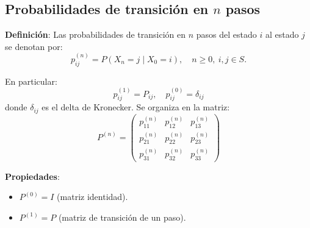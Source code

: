 \documentclass[12pt,a4paper]{article}
\begin{document}
\begin{center}
\end{center}

\subsection*{Probabilidades de transición en $n$ pasos}

\textbf{Definición}: Las probabilidades de transición en $n$ pasos del estado $i$ al estado $j$ se denotan por:
\begin{equation*}
p_{ij}^{(n)} = P(X_n = j \mid X_0 = i), \quad n \geq 0, \ i, j \in S.
\end{equation*}

En particular:
\begin{equation*}
p_{ij}^{(1)} = P_{ij}, \quad p_{ij}^{(0)} = \delta_{ij}
\end{equation*}
donde $\delta_{ij}$ es el delta de Kronecker. Se organiza en la matriz:
\begin{equation*}
P^{(n)} =
\begin{pmatrix}
p_{11}^{(n)} & p_{12}^{(n)} & p_{13}^{(n)} \\
p_{21}^{(n)} & p_{22}^{(n)} & p_{23}^{(n)} \\
p_{31}^{(n)} & p_{32}^{(n)} & p_{33}^{(n)}
\end{pmatrix}
\end{equation*}

\textbf{Propiedades}:
\begin{itemize}
    \item $P^{(0)} = I$ (matriz identidad).
    \item $P^{(1)} = P$ (matriz de transición de un paso).
\end{itemize}
\end{document}
